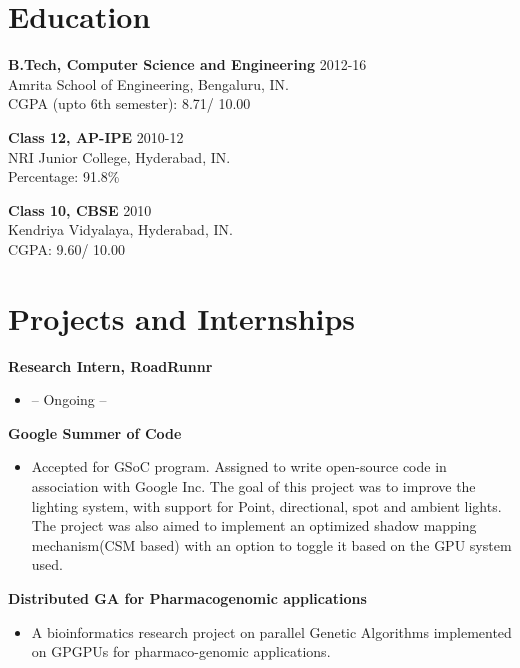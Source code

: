 \documentclass{res}
\begin{document}
 
\thispagestyle{empty} %
\address{ http://sricharan.xyz - mail@sricharan.xyz - (+91) 9035 886166  }


\begin{resume}
\vspace{0.1in}

\section{Education}
\vspace{0.1in} 
		 {\bf B.Tech, Computer Science and Engineering} \hfill 2012-16 \\
			Amrita School of Engineering, Bengaluru, IN. \\
			CGPA (upto 6th semester): 8.71/ 10.00
			
			{\bf Class 12, AP-IPE} \hfill 2010-12 \\
			NRI Junior College, Hyderabad, IN. \\
			Percentage: 91.8\%
			
			{\bf Class 10, CBSE} \hfill 2010 \\
			Kendriya Vidyalaya, Hyderabad, IN. \\
			CGPA: 9.60/ 10.00
\section{Projects and Internships} 
\vspace{0.1in}
	{\bf Research Intern, RoadRunnr}
    \begin{itemize} %
      \item[]  -- Ongoing -- 
      \end{itemize}
  {\bf Google Summer of Code}
    \begin{itemize} %
      \item[] Accepted for GSoC program. Assigned to write
				open-source code in association with Google Inc. The goal of
				this project was to improve the lighting system, with support for Point,
				directional, spot and ambient lights. The project was also aimed to implement
				an optimized shadow mapping mechanism(CSM based) with an option to
				toggle it based on the GPU system used.
      \end{itemize}
{\bf Distributed GA for Pharmacogenomic applications} 
       \begin{itemize}
        \item[] A bioinformatics research project on parallel Genetic Algorithms
				implemented on GPGPUs for pharmaco-genomic applications.
    \end{itemize}


\end{resume}
\end{document}
